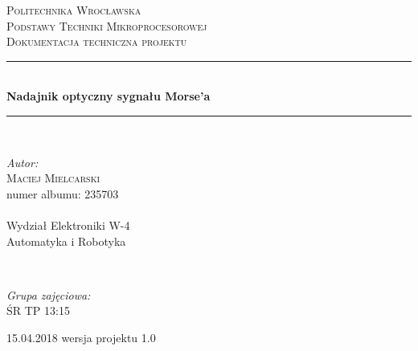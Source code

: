 \documentclass{article}
\begin{document}
\begin{titlepage} 
	\newcommand{\HRule}{\rule{\linewidth}{0.5mm}} 
	
	\center 
	
	
	\textsc{\LARGE Politechnika Wrocławska}\\[1.5cm] %
	
	\textsc{\Large Podstawy Techniki Mikroprocesorowej}\\[0.5cm] %
	
	\textsc{\large Dokumentacja techniczna projektu}\\[0.5cm] %
	
	
	\HRule\\[0.4cm]
	
	{\huge\bfseries Nadajnik optyczny sygnału Morse'a}\\[0.4cm] %
	
	\HRule\\[1.5cm]
	
	
	\begin{minipage}{0.5\textwidth}
		\begin{flushleft}
			\large
			\textit{Autor:}\\
			\textsc{Maciej Mielcarski} \\numer albumu: 235703\\~\\Wydział Elektroniki W-4\\Automatyka i Robotyka 
		\end{flushleft}
	\end{minipage}
	~
	\begin{minipage}{0.4\textwidth}
		\begin{flushright}
			\large
			\textit{Grupa zajęciowa:}\\
			\textsc{ŚR TP 13:15} 
		\end{flushright}
	\end{minipage}

\vfill\vfill\vfill %
	
	{\large 15.04.2018 wersja projektu 1.0 } %
	
\end{titlepage}
\end{document}
